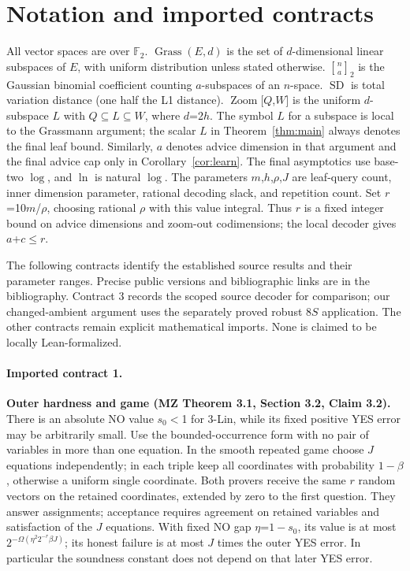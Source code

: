 \section{Notation and imported contracts}\label{sec:3}
All vector spaces are over \(\mathbb F_2\). \(\operatorname{Grass}(E,d)\) is the set of \(d\)-dimensional linear subspaces of \(E\), with uniform distribution unless stated otherwise. \(\genfrac{[}{]}{0pt}{}{n}{a}_2\) is the Gaussian binomial coefficient counting \(a\)-subspaces of an \(n\)-space. \(\operatorname{SD}\) is total variation distance (one half the L1 distance). \(\operatorname{Zoom}\)[\(Q\),\(W\)] is the uniform \(d\)-subspace \(L\) with \(Q\subseteq L\subseteq W\), where \(d\)=2\(h\). The symbol \(L\) for a subspace is local to the Grassmann argument; the scalar \(L\) in Theorem~\ref{thm:main} always denotes the final leaf bound. Similarly, \(a\) denotes advice dimension in that argument and the final advice cap only in Corollary~\ref{cor:learn}. The final asymptotics use base-two \(\log\), and \(\ln\) is natural \(\log\). The parameters \(m\),\(h\),\(\rho\),\(J\) are leaf-query count, inner dimension parameter, rational decoding slack, and repetition count. Set \(r\)=10\(m\)/\(\rho\), choosing rational \(\rho\) with this value integral. Thus \(r\) is a fixed integer bound on advice dimensions and zoom-out codimensions; the local decoder gives \(a\)+\(c\)\(\le\)\(r\).

The following contracts identify the established source results and their parameter ranges. Precise public versions and bibliographic links are in the bibliography. Contract 3 records the scoped source decoder for comparison; our changed-ambient argument uses the separately proved robust 8\(S\) application. The other contracts remain explicit mathematical imports. None is claimed to be locally Lean-formalized.

\paragraph{Imported contract 1.} \textbf{Outer hardness and game (MZ Theorem 3.1, Section 3.2, Claim 3.2).} There is an absolute NO value \(s_0\)\(<\)1 for 3-Lin, while its fixed positive YES error may be arbitrarily small. Use the bounded-occurrence form with no pair of variables in more than one equation. In the smooth repeated game choose \(J\) equations independently; in each triple keep all coordinates with probability \(1-\beta\), otherwise a uniform single coordinate. Both provers receive the same \(r\) random vectors on the retained coordinates, extended by zero to the first question. They answer assignments; acceptance requires agreement on retained variables and satisfaction of the \(J\) equations. With fixed NO gap \(\eta\)=\(1-s_0\), its value is at most \(2^{-\Omega(\eta^2 2^{-r} \beta J)}\); its honest failure is at most \(J\) times the outer YES error. In particular the soundness constant does not depend on that later YES error.

